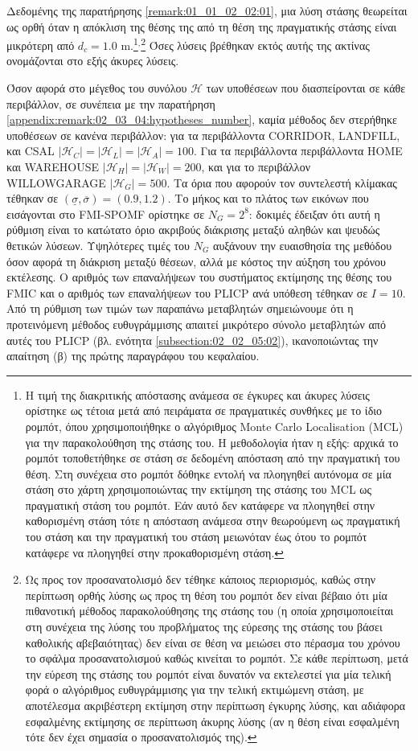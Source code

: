 Δεδομένης της παρατήρησης \ref{remark:01_01_02_02:01}, μια λύση στάσης
θεωρείται ως ορθή όταν η απόκλιση της θέσης της από τη θέση της πραγματικής
στάσης είναι μικρότερη από $d_c = 1.0$ m.\footnote{Η τιμή της διακριτικής
απόστασης ανάμεσα σε έγκυρες και άκυρες λύσεις ορίστηκε ως τέτοια μετά από
πειράματα σε πραγματικές συνθήκες με το ίδιο ρομπότ, όπου χρησιμοποιήθηκε ο
αλγόριθμος Monte Carlo Localisation (MCL) για την παρακολούθηση της στάσης του.
Η μεθοδολογία ήταν η εξής: αρχικά το ρομπότ τοποθετήθηκε σε στάση σε δεδομένη
απόσταση από την πραγματική του θέση. Στη συνέχεια στο ρομπότ δόθηκε εντολή να
πλοηγηθεί αυτόνομα σε μία στάση στο χάρτη χρησιμοποιώντας την εκτίμηση της
στάσης του MCL ως πραγματική στάση του ρομπότ. Εάν αυτό δεν κατάφερε να
πλοηγηθεί στην καθορισμένη στάση τότε η απόσταση ανάμεσα στην θεωρούμενη ως
πραγματική του στάση και την πραγματική του στάση μειωνόταν έως ότου το ρομπότ
κατάφερε να πλοηγηθεί στην προκαθορισμένη στάση.}$^,$\footnote{Ως προς τον
προσανατολισμό δεν τέθηκε κάποιος περιορισμός, καθώς στην περίπτωση ορθής λύσης
ως προς τη θέση του ρομπότ δεν είναι βέβαιο ότι μία πιθανοτική μέθοδος
παρακολούθησης της στάσης του (η οποία χρησιμοποιείται στη συνέχεια της λύσης
του προβλήματος της εύρεσης της στάσης του βάσει καθολικής αβεβαιότητας) δεν
είναι σε θέση να μειώσει στο πέρασμα του χρόνου το σφάλμα προσανατολισμού καθώς
κινείται το ρομπότ. Σε κάθε περίπτωση, μετά την εύρεση της στάσης του ρομπότ
είναι δυνατόν να εκτελεστεί για μία τελική φορά ο αλγόριθμος ευθυγράμμισης για
την τελική εκτιμώμενη στάση, με αποτέλεσμα ακριβέστερη εκτίμηση στην περίπτωση
έγκυρης λύσης, και αδιάφορα εσφαλμένης εκτίμησης σε περίπτωση άκυρης λύσης (αν
η θέση είναι εσφαλμένη τότε δεν έχει σημασία ο προσανατολισμός της).} Όσες
λύσεις βρέθηκαν εκτός αυτής της ακτίνας ονομάζονται στο εξής άκυρες λύσεις.

Όσον αφορά στο μέγεθος του συνόλου $\mathcal{H}$ των υποθέσεων που
διασπείρονται σε κάθε περιβάλλον, σε συνέπεια με την παρατήρηση
\ref{appendix:remark:02_03_04:hypotheses_number}, καμία μέθοδος δεν στερήθηκε
υποθέσεων σε κανένα περιβάλλον: για τα περιβάλλοντα CORRIDOR, LANDFILL, και
CSAL $|\mathcal{H}_C| = |\mathcal{H}_L| = |\mathcal{H}_A| = 100$. Για τα
περιβάλλοντα περιβάλλοντα HOME και WAREHOUSE $|\mathcal{H}_H| = |\mathcal{H}_W|
= 200$, και για το περιβάλλον WILLOWGARAGE $|\mathcal{H}_G| = 500$.  Τα όρια
που αφορούν τον συντελεστή κλίμακας τέθηκαν σε $(\underline{\sigma},
\overline{\sigma}) = (0.9, 1.2)$. Το μήκος και το πλάτος των εικόνων που
εισάγονται στο FMI-SPOMF ορίστηκε σε $N_G = 2^8$: δοκιμές έδειξαν ότι αυτή η
ρύθμιση είναι το κατώτατο όριο ακριβούς διάκρισης μεταξύ αληθών και ψευδώς
θετικών λύσεων. Υψηλότερες τιμές του $N_G$ αυξάνουν την ευαισθησία της μεθόδου
όσον αφορά τη διάκριση μεταξύ θέσεων, αλλά με κόστος την αύξηση του χρόνου
εκτέλεσης. Ο αριθμός των επαναλήψεων του συστήματος εκτίμησης της θέσης του
FMIC και ο αριθμός των επαναλήψεων του PLICP ανά υπόθεση τέθηκαν σε $I = 10$.
Από τη ρύθμιση των τιμών των παραπάνω μεταβλητών σημειώνουμε ότι η προτεινόμενη
μέθοδος ευθυγράμμισης απαιτεί μικρότερο σύνολο μεταβλητών από αυτές του
PLICP (βλ. ενότητα \ref{subsection:02_02_05:02}), ικανοποιώντας την απαίτηση
(β) της πρώτης παραγράφου του κεφαλαίου.

